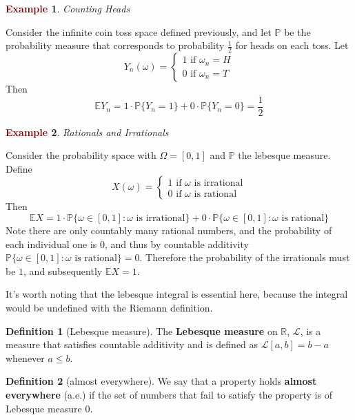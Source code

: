 \documentclass[11pt]{article}
\theoremstyle{definition}
\theoremstyle{definition}
\newcommand{\R}[0]{\mathbb{R}}
\theoremstyle{definition}
\newtheorem{definition}{\textcolor{OliveGreen}{Definition}}
\newtheorem{ex}{\textcolor{Maroon}{Example}}
\theoremstyle{remark}
\begin{document}
\begin{ex}\textit{Counting Heads}
    
    Consider the infinite coin toss space defined previously, and let $\mathbb{P}$ be the probability measure
    that corresponds to probability $\frac{1}{2}$ for heads on each toss. Let
    \[
        Y_n(\omega) = \begin{cases}
            1 \text{ if } \omega_n = H \\
            0 \text{ if } \omega_n = T
        \end{cases}
    \]  
    Then
    \[
        \mathbb{E} Y_n = 1 \cdot \mathbb{P}\{Y_n = 1\} + 0 \cdot \mathbb{P}\{Y_n = 0\} = \frac{1}{2}
    \] 
\end{ex}

\begin{ex}\textit{Rationals and Irrationals}

    Consider the probability space with $\Omega = [0, 1]$ and $\mathbb{P}$ the lebesque measure.
    Define 
    \[
        X(\omega) = \begin{cases}
            1 \text{ if } \omega \text{ is irrational} \\
            0 \text{ if } \omega \text{ is rational}
        \end{cases}
    \] 
    Then 
    \[
        \mathbb{E} X = 1 \cdot \mathbb{P}\{\omega \in [0, 1] : \omega \text{ is irrational}\} + 0 \cdot \mathbb{P}\{\omega \in [0, 1] : \omega \text{ is rational}\}
    \] 
    Note there are only countably many rational numbers, and the probability of each individual one is $0$, and thus
    by countable additivity $\mathbb{P}\{\omega \in [0, 1] : \omega \text{ is rational}\} = 0$. Therefore the probability
    of the irrationals must be $1$, and subsequently $\mathbb{E} X = 1$.

    It's worth noting that the lebesque integral is essential here, because the integral would be undefined with
    the Riemann definition.
\end{ex}

\begin{definition}[Lebesque measure]
    The \textbf{Lebesque measure} on $\R$, $\mathcal{L}$, is a measure that satisfies countable additivity
    and is defined as $\mathcal{L}[a, b] = b - a$ whenever $a \leq b$.   
\end{definition}

\begin{definition}[almost everywhere]
    We say that a property holds \textbf{almost everywhere} (a.e.) if the set of numbers that fail to satisfy
    the property is of Lebesque measure $0$. 
\end{definition}
\end{document}
